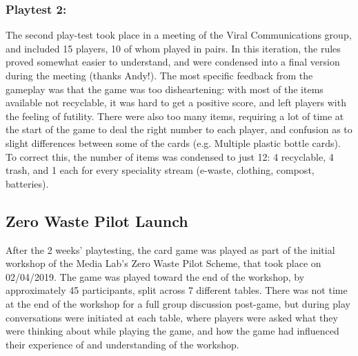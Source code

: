 \documentclass[nofonts,nols,justified,nobib]{tufte-book}
\begin{document}
\subsubsection*{Playtest 2:}
The second play-test took place in a meeting of the Viral Communications group, and included 15 players, 10 of whom played in pairs. In this iteration, the rules proved somewhat easier to understand, and were condensed into a final version during the meeting (thanks Andy!).
The most specific feedback from the gameplay was that the game was too disheartening: with most of the items available not recyclable, it was hard to get a positive score, and left players with the feeling of futility. There were also too many items, requiring a lot of time at the start of the game to deal the right number to each player, and confusion as to slight differences between some of the cards (e.g. Multiple plastic bottle cards). To correct this, the number of items was condensed to just 12: 4 recyclable, 4 trash, and 1 each for every speciality stream (e-waste, clothing, compost, batteries).

\subsection*{Zero Waste Pilot Launch}
After the 2 weeks' playtesting, the card game was played as part of the initial workshop of the Media Lab's Zero Waste Pilot Scheme, that took place on 02/04/2019. The game was played toward the end of the workshop, by approximately 45 participants, split across 7 different tables. There was not time at the end of the workshop for a full group discussion post-game, but during play conversations were initiated at each table, where players were asked what they were thinking about while playing the game, and how the game had influenced their experience of and understanding of the workshop.
\end{document}
